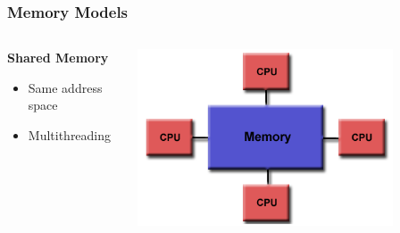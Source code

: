 \documentclass[t]{beamer}
\begin{document}
\begin{frame}
\frametitle{Memory Models}
\begin{columns}
\begin{column}{.4\textwidth}
\textbf{Shared Memory}
\begin{itemize}
  \item Same address space
  \item Multithreading
\end{itemize}
\end{column}

\begin{column}{.6\textwidth}
\begin{center}
\includegraphics[width=0.8\textwidth]{img/shared_mem.png} 
\end{center}
\end{column}
\end{columns}
\end{frame}
\end{document}
